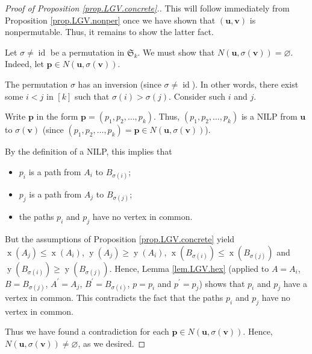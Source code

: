 \documentclass[reqno]{amsart}%
\newcommand{\0}{\phantom{c}}
\theoremstyle{plain}
\theoremstyle{definition}
\numberwithin{equation}{section}
\begin{document}
\begin{proof}
[Proof of Proposition \ref{prop.LGV.concrete}.]This will follow immediately
from Proposition \ref{prop.LGV.nonper} once we have shown that $\left(
\mathbf{u},\mathbf{v}\right)  $ is nonpermutable. Thus, it remains to show the
latter fact.

Let $\sigma\neq\operatorname*{id}$ be a permutation in $\mathfrak{S}_{k}$. We
must show that $N\left(  \mathbf{u},\sigma\left(  \mathbf{v}\right)  \right)
=\varnothing$. Indeed, let $\mathbf{p}\in N\left(  \mathbf{u},\sigma\left(
\mathbf{v}\right)  \right)  $.

The permutation $\sigma$ has an inversion (since $\sigma\neq\operatorname*{id}%
$). In other words, there exist some $i<j$ in $\left[  k\right]  $ such that
$\sigma\left(  i\right)  >\sigma\left(  j\right)  $. Consider such $i$ and $j$.

Write $\mathbf{p}$ in the form $\mathbf{p}=\left(  p_{1},p_{2},\ldots
,p_{k}\right)  $. Thus, $\left(  p_{1},p_{2},\ldots,p_{k}\right)  $ is a NILP
from $\mathbf{u}$ to $\sigma\left(  \mathbf{v}\right)  $ (since $\left(
p_{1},p_{2},\ldots,p_{k}\right)  =\mathbf{p}\in N\left(  \mathbf{u}%
,\sigma\left(  \mathbf{v}\right)  \right)  $).

By the definition of a NILP, this implies that

\begin{itemize}
\item $p_{i}$ is a path from $A_{i}$ to $B_{\sigma\left(  i\right)  }$;

\item $p_{j}$ is a path from $A_{j}$ to $B_{\sigma\left(  j\right)  }$;

\item the paths $p_{i}$ and $p_{j}$ have no vertex in common.
\end{itemize}

But the assumptions of Proposition \ref{prop.LGV.concrete} yield
$\operatorname*{x}\left(  A_{j}\right)  \leq\operatorname*{x}\left(
A_{i}\right)  $, $\operatorname*{y}\left(  A_{j}\right)  \geq\operatorname*{y}%
\left(  A_{i}\right)  $, $\operatorname*{x}\left(  B_{\sigma\left(  i\right)
}\right)  \leq\operatorname*{x}\left(  B_{\sigma\left(  j\right)  }\right)  $
and $\operatorname*{y}\left(  B_{\sigma\left(  i\right)  }\right)
\geq\operatorname*{y}\left(  B_{\sigma\left(  j\right)  }\right)  $. Hence,
Lemma \ref{lem.LGV.hex} (applied to $A=A_{i}$, $B=B_{\sigma\left(  j\right)
}$, $A^{\prime}=A_{j}$, $B^{\prime}=B_{\sigma\left(  i\right)  }$, $p=p_{i}$
and $p^{\prime}=p_{j}$) shows that $p_{i}$ and $p_{j}$ have a vertex in
common. This contradicts the fact that the paths $p_{i}$ and $p_{j}$ have no
vertex in common.

Thus we have found a contradiction for each $\mathbf{p}\in N\left(
\mathbf{u},\sigma\left(  \mathbf{v}\right)  \right)  $. Hence, $N\left(
\mathbf{u},\sigma\left(  \mathbf{v}\right)  \right)  \neq\varnothing$, as we desired.
\end{proof}
\end{document}
